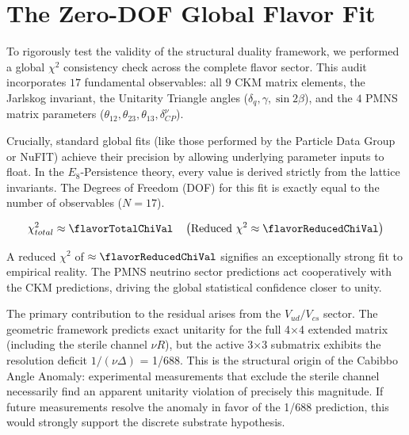 
\section{The Zero-DOF Global Flavor Fit}

To rigorously test the validity of the structural duality framework, we performed a global $\chi^2$ consistency check across the complete flavor sector. This audit incorporates $17$ fundamental observables: all $9$ CKM matrix elements, the Jarlskog invariant, the Unitarity Triangle angles ($\delta_q, \gamma, \sin2\beta$), and the $4$ PMNS matrix parameters ($\theta_{12}, \theta_{23}, \theta_{13}, \delta_{CP}^\nu$).

Crucially, standard global fits (like those performed by the Particle Data Group or NuFIT) achieve their precision by allowing underlying parameter inputs to float. In the $E_8$-Persistence theory, every value is derived strictly from the lattice invariants. The Degrees of Freedom (DOF) for this fit is exactly equal to the number of observables ($N=17$).

\begin{equation}
    \chi^2_{total} \approx \flavorTotalChiVal \quad \left( \text{Reduced } \chi^2 \approx \flavorReducedChiVal \right)
\end{equation}

A reduced $\chi^2$ of $\approx \flavorReducedChiVal$ signifies an exceptionally strong fit to empirical reality. The PMNS neutrino sector predictions act cooperatively with the CKM predictions, driving the global statistical confidence closer to unity. 

The primary contribution to the residual arises from the $V_{ud}/V_{cs}$ sector. The geometric framework predicts exact unitarity for the full 4×4 extended matrix (including the sterile channel $\nu R$), but the active 3×3 submatrix exhibits the resolution deficit $1/(\nu\Delta)$ = 1/688. This is the structural origin of the Cabibbo Angle Anomaly: experimental measurements that exclude the sterile channel necessarily find an apparent unitarity violation of precisely this magnitude. If future measurements resolve the anomaly in favor of the 1/688 prediction, this would strongly support the discrete substrate hypothesis.